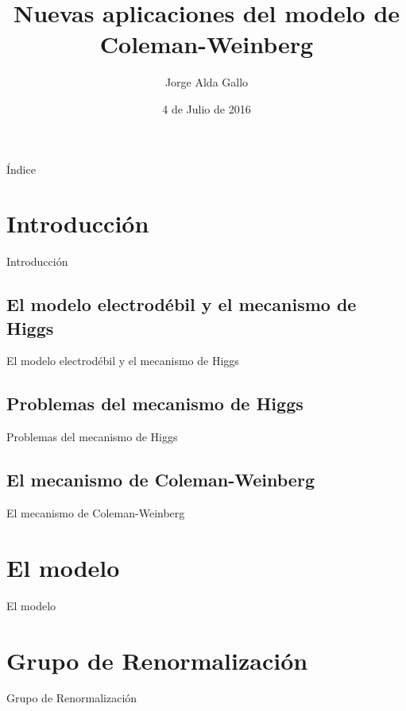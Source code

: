 \documentclass{beamer}
\author{Jorge Alda Gallo}
\title{Nuevas aplicaciones del modelo de Coleman-Weinberg}
\institute{Departamento de Física Teórica I, Universidad Complutense de Madrid}
\date{4 de Julio de 2016}
\begin{document}
\begin{frame}[t, plain]
\titlepage
\end{frame}

\begin{frame}[t]{Índice}
\tableofcontents
\end{frame}

\section{Introducción}
\begin{frame}[t]{Introducción}

\end{frame}
\subsection{El modelo electrodébil y el mecanismo de Higgs}
\begin{frame}[t]{El modelo electrodébil y el mecanismo de Higgs}

\end{frame}

\subsection{Problemas del mecanismo de Higgs}
\begin{frame}[t]{Problemas del mecanismo de Higgs}

\end{frame}

\subsection{El mecanismo de Coleman-Weinberg}
\begin{frame}[t]{El mecanismo de Coleman-Weinberg}

\end{frame}

\section{El modelo}
\begin{frame}[t]{El modelo}

\end{frame}

\section{Grupo de Renormalización}
\begin{frame}[t]{Grupo de Renormalización}

\end{frame}
\end{document}
